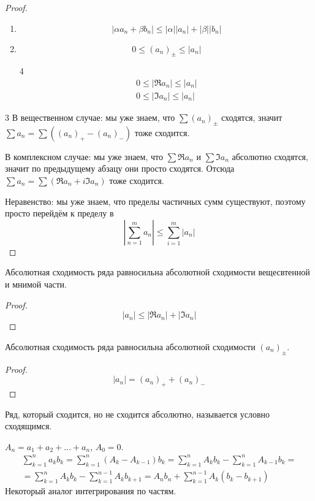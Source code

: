 \begin{proof}
	\begin{enumerate}
	\item
		\[ |\alpha a_n + \beta b_n| \le |\alpha| |a_n| + |\beta| |b_n| \]

	\item
		\[ 0 \le (a_n)_\pm \le |a_n| \]

	\item[4]
		\begin{gather*}
			0 \le |\Re a_n| \le |a_n| \\
			0 \le |\Im a_n| \le |a_n|
		\end{gather*}
	\end{enumerate}

	\item[3]
		В вещественном случае: мы уже знаем, что $\sum (a_n)_\pm$ сходятся, значит $\sum a_n = \sum \left((a_n)_+ - (a_n)_-\right)$ тоже сходится.

		В комплексном случае: мы уже знаем, что $\sum \Re a_n$ и $\sum \Im a_n$ абсолютно сходятся, значит по предыдущему абзацу они просто сходятся.
		Отсюда $\sum a_n = \sum (\Re a_n + i \Im a_n)$ тоже сходится.

		Неравенство: мы уже знаем, что пределы частичных сумм существуют, поэтому просто перейдём к пределу в
		\[ \left| \sum_{n=1}^m a_n \right| \le \sum_{i=1}^m |a_n|\]
\end{proof}

\begin{Rem}
	Абсолютная сходимость ряда равносильна абсолютной сходимости вещесвтенной и мнимой части.
\end{Rem}
\begin{proof}
	\[ |a_n| \le |\Re a_n| + |\Im a_n| \]
\end{proof}

\begin{Rem}
	Абсолютная сходимость ряда равносильна абсолютной сходимости $(a_n)_\pm$.
\end{Rem}
\begin{proof}
	\[ |a_n| = (a_n)_+ + (a_n)_- \]
\end{proof}

\begin{Def}
	Ряд, который сходится, но не сходится абсолютно, называется условно сходящимся.
\end{Def}

\begin{theorem}
	$A_n = a_1 + a_2 + \dots + a_n$, $A_0 = 0$.
	\begin{gather*}
		\sum_{k=1}^n a_k b_k = \sum_{k=1}^n (A_k - A_{k-1})b_k = \sum_{k=1}^n A_kb_k - \sum_{k=1}^n A_{k-1}b_k = \\
		= \sum_{k=1}^n A_kb_k - \sum_{k=1}^{n-1} A_kb_{k+1} = A_nb_n + \sum_{k=1}^{n-1} A_k (b_k - b_{k+1})
	\end{gather*}
	Некоторый аналог интегрирования по частям.
\end{theorem}

